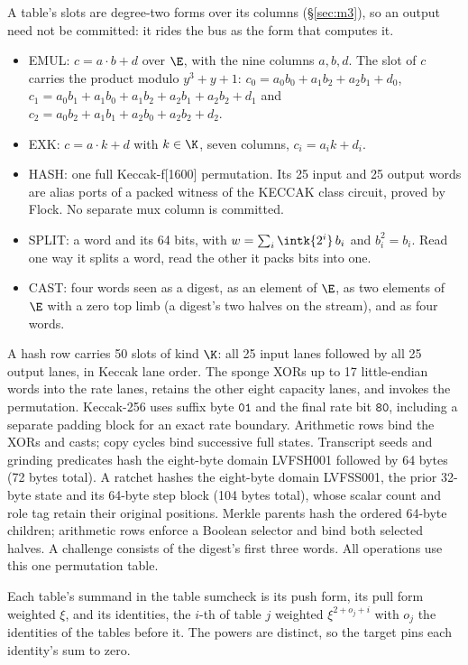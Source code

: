 A table's slots are degree-two forms over its columns (\S\ref{sec:m3}), so an output need not be committed: it rides the bus as the form that computes it.
\begin{itemize}[itemsep=1pt,topsep=3pt]
\item \textsf{EMUL}: $c=a\cdot b+d$ over $\E$, with the nine columns $a,b,d$. The slot of $c$ carries the product modulo $y^3+y+1$: $c_0=a_0b_0+a_1b_2+a_2b_1+d_0$, $c_1=a_0b_1+a_1b_0+a_1b_2+a_2b_1+a_2b_2+d_1$ and $c_2=a_0b_2+a_1b_1+a_2b_0+a_2b_2+d_2$.
\item \textsf{EXK}: $c=a\cdot k+d$ with $k\in\K$, seven columns, $c_i=a_ik+d_i$.
\item \textsf{HASH}: one full Keccak-f[1600] permutation. Its 25 input and 25 output words are alias ports of a packed witness of the \textsf{KECCAK} class circuit, proved by Flock. No separate mux column is committed.
\item \textsf{SPLIT}: a word and its 64 bits, with $w=\sum_i\intk{2^i}\,b_i$ and $b_i^2=b_i$. Read one way it splits a word, read the other it packs bits into one.
\item \textsf{CAST}: four words seen as a digest, as an element of $\E$, as two elements of $\E$ with a zero top limb (a digest's two halves on the stream), and as four words.
\end{itemize}
A hash row carries 50 slots of kind $\K$: all 25 input lanes followed by all 25 output lanes, in Keccak lane order. The sponge XORs up to 17 little-endian words into the rate lanes, retains the other eight capacity lanes, and invokes the permutation. Keccak-256 uses suffix byte $\mathtt{01}$ and the final rate bit $\mathtt{80}$, including a separate padding block for an exact rate boundary. Arithmetic rows bind the XORs and casts; copy cycles bind successive full states. Transcript seeds and grinding predicates hash the eight-byte domain LVFSH001 followed by 64 bytes (72 bytes total). A ratchet hashes the eight-byte domain LVFSS001, the prior 32-byte state and its 64-byte step block (104 bytes total), whose scalar count and role tag retain their original positions. Merkle parents hash the ordered 64-byte children; arithmetic rows enforce a Boolean selector and bind both selected halves. A challenge consists of the digest's first three words. All operations use this one permutation table.

Each table's summand in the table sumcheck is its push form, its pull form weighted $\xi$, and its identities, the $i$-th of table $j$ weighted $\xi^{2+o_j+i}$ with $o_j$ the identities of the tables before it. The powers are distinct, so the target pins each identity's sum to zero.

